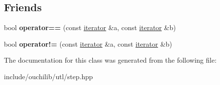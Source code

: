 \subsection*{Friends}
\begin{DoxyCompactItemize}
\item 
\mbox{\label{classouchi_1_1step_1_1iterator_a81d10d7799462c7ca5e7cf19119ca356}} 
bool {\bfseries operator==} (const \mbox{\hyperlink{classouchi_1_1step_1_1iterator}{iterator}} \&a, const \mbox{\hyperlink{classouchi_1_1step_1_1iterator}{iterator}} \&b)
\item 
\mbox{\label{classouchi_1_1step_1_1iterator_a55a8ee0e80dad1a7da9d751c25bc0386}} 
bool {\bfseries operator!=} (const \mbox{\hyperlink{classouchi_1_1step_1_1iterator}{iterator}} \&a, const \mbox{\hyperlink{classouchi_1_1step_1_1iterator}{iterator}} \&b)
\end{DoxyCompactItemize}


The documentation for this class was generated from the following file\+:\begin{DoxyCompactItemize}
\item 
include/ouchilib/utl/step.\+hpp\end{DoxyCompactItemize}
